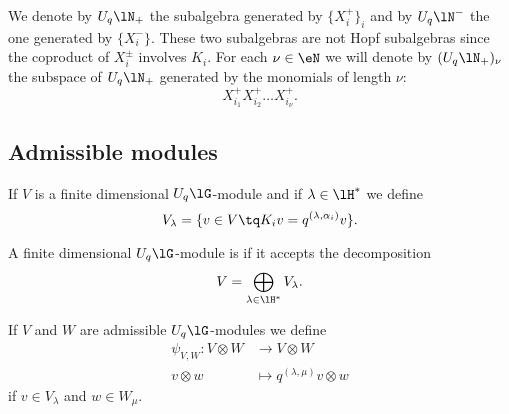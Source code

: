 We denote by \( U_q\lN_+\) the subalgebra generated by \( \{ X^+ _i\}_i\) and by \( U_q\lN^-\) the one generated by \( \{ X_i^- \}\). These two subalgebras are not Hopf subalgebras since the coproduct of \( X^{\pm}_i\) involves \( K_i\). For each \( \nu\in\eN\) we will denote by \( (U_q\lN_+)_{\nu}\) the subspace of \( U_q\lN_+\) generated by the monomials of length \( \nu\):
\begin{equation}
    X_{i_1}^{+}X_{i_2}^+\ldots X_{i_{\nu}}^+.
\end{equation}


\subsection{Admissible modules}

If \( V\) is a finite dimensional \( U_q\lG\)-module and if \( \lambda\in\lH^*\) we define
\begin{equation}
    V_{\lambda}=\{ v\in V\tq K_iv=q^{(\lambda,\alpha_i)}v \}.
\end{equation}
\begin{definition}
    A finite dimensional \( U_q\lG\)-module is  if it accepts the decomposition
    \begin{equation}
        V=\bigoplus_{\lambda\in\lH^*}V_{\lambda}.
    \end{equation}
\end{definition}

If \( V\) and \( W\) are admissible \( U_q\lG\)-modules we define 
\begin{equation}
    \begin{aligned}
        \psi_{V,W}\colon V\otimes W&\to V\otimes W \\
        v\otimes w&\mapsto q^{(\lambda,\mu)}v\otimes w 
    \end{aligned}
\end{equation}
if \( v\in V_{\lambda}\) and \( w\in W_{\mu}\).

